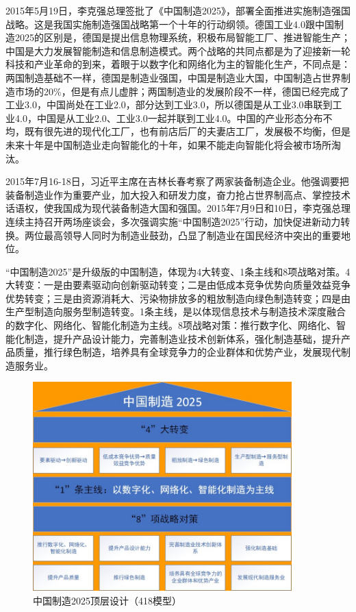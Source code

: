 \documentclass[lang=cn,12pt,bibtex,newtx,twoside,margintrue,citestyle=gb7714-2015, bibstyle=gb7714-2015]{elegantbook}
\begin{document}
\begin{enumerate}
2015年5月19日，李克强总理签批了《中国制造2025》，部署全面推进实施制造强国战略。这是我国实施制造强国战略第一个十年的行动纲领。德国工业4.0跟中国制造2025的区别是，德国是提出信息物理系统，积极布局智能工厂、推进智能生产；中国是大力发展智能制造和信息制造模式。两个战略的共同点都是为了迎接新一轮科技和产业革命的到来，着眼于以数字化和网络化为主的智能化生产，不同点是：两国制造基础不一样，德国是制造业强国，中国是制造业大国，中国制造占世界制造市场的20\%，但是有点儿虚胖；两国制造业的发展阶段不一样，德国已经完成了工业3.0，中国尚处在工业2.0，部分达到工业3.0，所以德国是从工业3.0串联到工业4.0，中国是从工业2.0、工业3.0一起并联到工业4.0\cite{高潮2016}。中国的产业形态分布不均，既有很先进的现代化工厂，也有前店后厂的夫妻店工厂，发展极不均衡，但是未来十年是中国制造业走向智能化的十年，如果不能走向智能化将会被市场所淘汰。

2015年7月16-18日，习近平主席在吉林长春考察了两家装备制造企业。他强调要把装备制造业作为重要产业，加大投入和研发力度，奋力抢占世界制高点、掌控技术话语权，使我国成为现代装备制造大国和强国。2015年7月9日和10日，李克强总理连续主持召开两场座谈会，多次强调实施“中国制造2025”行动，加快促进新动力转换。两位最高领导人同时为制造业鼓劲，凸显了制造业在国民经济中突出的重要地位。

“中国制造2025”是升级版的中国制造，体现为4大转变、1条主线和8项战略对策。4大转变：一是由要素驱动向创新驱动转变；二是由低成本竞争优势向质量效益竞争优势转变；三是由资源消耗大、污染物排放多的粗放制造向绿色制造转变；四是由生产型制造向服务型制造转变。1条主线，是以体现信息技术与制造技术深度融合的数字化、网络化、智能化制造为主线。8项战略对策：推行数字化、网络化、智能化制造，提升产品设计能力，完善制造业技术创新体系，强化制造基础，提升产品质量，推行绿色制造，培养具有全球竞争力的企业群体和优势产业，发展现代制造服务业。

\begin{figure}[htbp]
\centering
\includegraphics[angle=0,width=10cm]{./figure/4.2.jpg}
\caption{\label{4.2}中国制造2025顶层设计（418模型）}
\end{figure}


\end{enumerate}
\end{document}
